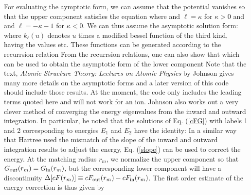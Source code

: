 \documentclass[11pt]{article}
\begin{document}
For evaluating the aymptotic form, 
we can assume that the potential vanishes so that the upper component
satisfies the equation
where 
and $\ell=\kappa$ for $\kappa>0$ and 
and $\ell=-\kappa-1$ for $\kappa<0$.  
We can thus assume the asymptotic solution form:
where $k_{\ell}(u)$ denotes $u$ times a modified bessel function
of the third kind, having the values
etc.
These functions can be generated according to the recurrsion 
relation\cite{HBMF}
From the recurrsion relations\cite{HBMF}, one can also show that
which can be used to obtain the asymptotic form of the lower component
Note that the text, {\em{Atomic Structure Theory: Lectures on 
Atomic Physics}} by Johnson\cite{johnson_atomic_2007} gives many more 
details on the asymptotic forms and a later version of this code
should include those results. At the moment, the code
only includes the leading terms quoted here and will not work for an
ion.
    Johnson\cite{johnson_atomic_2007}
also works out a very clever method of converging the energy 
eigenvalues from the inward and outward integration.   In particular,
he noted that the solutions of Eq. (\ref{cFG}) with labels 1 and 2 
corresponding to energies $E_1$ and $E_2$ have the identity:
In a similar way that Hartree\cite{Hartree} used the mismatch
of the slope of the inward and outward integration results to adjust
the energy, Eq. (\ref{slope}) can be used to correct the energy.   At
the matching radius $r_m$, we normalize the upper component so that
$G_{\rm out}(r_m)=G_{\rm in}(r_m)$, but the corresponding lower component
will have a discontinuity $\Delta [cF(r_m)] \equiv 
cF_{\rm out}(r_m)-cF_{\rm in}(r_m)$.
The first order estimate of the energy correction is thus given by
\end{document}
